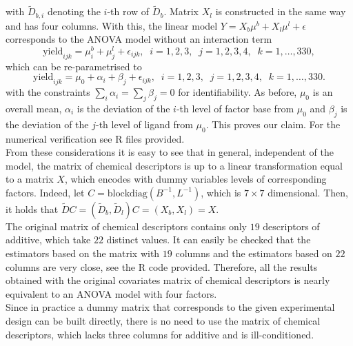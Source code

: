 \documentclass[12pt]{article}
\begin{document}
with $\widetilde{D}_{b,i}$ denoting the $i$-th row of $\widetilde{D}_b$. Matrix $X_l$ is constructed in the same way and has four columns. With this, the linear model $Y=X_b\mu^b+X_l\mu^l+\epsilon$ corresponds to the ANOVA model without an interaction term
$$
\mbox{yield}_{ijk}=\mu^b_i+\mu^l_j+\epsilon_{ijk},\;\; i=1,2,3,\;\;j=1,2,3,4,\;\;k=1,\ldots,330,
$$
which can be re-parametrised to
$$
\mbox{yield}_{ijk}=\mu_0+\alpha_i+\beta_j+\epsilon_{ijk},\;\; i=1,2,3,\;\;j=1,2,3,4,\;\;k=1,\ldots,330.
$$
with the constraints $\sum_i\alpha_i=\sum_j\beta_j=0$ for identifiability. As before, $\mu_0$ is an overall mean, $\alpha_i$ is the deviation of the $i$-th level of factor {\color{blue} base} from $\mu_0$ and $\beta_j$ is the deviation of the $j$-th level of {\color{blue} ligand} from $\mu_0$. This proves our claim. For the numerical verification see R files provided.\\From these considerations it is easy to see that in general, independent of the model, the matrix of chemical descriptors is up to a linear transformation equal to a matrix $X$, which encodes with dummy variables levels of corresponding factors. Indeed, let $C=\mbox{blockdiag}(B^{-1},L^{-1})$, which is $7\times 7$ dimensional. Then, it holds that $\widetilde{D}C=(\widetilde{D}_b,\widetilde{D}_l)C=(X_b,X_l)=X$. \\
The original matrix of chemical descriptors contains only $19$ descriptors of {\color{blue} additive}, which take $22$ distinct values. It can easily be checked that the estimators based on the matrix with $19$ columns and the estimators based on $22$ columns are very close, see the R code provided. Therefore, all the results obtained with the original covariates matrix of chemical descriptors is nearly equivalent to an ANOVA model with four factors. \\
Since in practice a dummy matrix that corresponds to the given experimental design can be built directly, there is no need to use the matrix of chemical descriptors, which lacks three columns for {\color{blue} additive} and is ill-conditioned.
\end{document}
